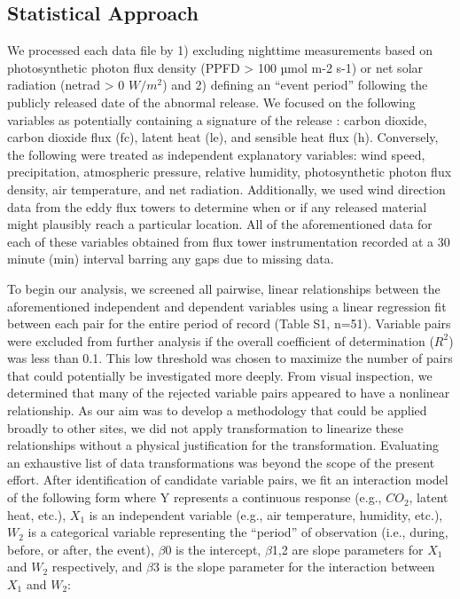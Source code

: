 \documentclass{article}
\begin{document}
\subsection{Statistical Approach}
We processed each data file by 1) excluding nighttime measurements based on photosynthetic photon flux density (PPFD > 100 µmol m-2 s-1) or net solar radiation (netrad > 0 $W/m^2$) and 2) defining an “event period” following the publicly released date of the abnormal release. We focused on the following variables as potentially containing a signature of the release : carbon dioxide, carbon dioxide flux (fc), latent heat (le), and sensible heat flux (h). Conversely, the following were treated as independent explanatory variables: wind speed, precipitation, atmospheric pressure, relative humidity, photosynthetic photon flux density, air temperature, and net radiation. Additionally, we used wind direction data from the eddy flux towers to determine when or if any released material might plausibly reach a particular location. All of the aforementioned data for each of these variables obtained from flux tower instrumentation recorded at a 30 minute (min) interval barring any gaps due to missing data.

To begin our analysis, we screened all pairwise, linear relationships between the aforementioned independent and dependent variables using a linear regression fit between each pair for the entire period of record (Table S1, n=51). Variable pairs were excluded from further analysis if the overall coefficient of determination ($R^2$) was less than 0.1. This low threshold was chosen to maximize the number of pairs that could potentially be investigated more deeply. From visual inspection, we determined that many of the rejected variable pairs appeared to have a nonlinear relationship. As our aim was to develop a methodology that could be applied broadly to other sites, we did not apply transformation to linearize these relationships without a physical justification for the transformation. Evaluating an exhaustive list of data transformations was beyond the scope of the present effort. After identification of candidate variable pairs, we fit an interaction model of the following form where Y represents a continuous response (e.g., $CO_2$, latent heat, etc.), $X_1$ is an independent variable (e.g., air temperature, humidity, etc.), $W_2$ is a categorical variable representing the “period” of observation (i.e., during, before, or after, the event), $\beta$0 is the intercept, $\beta$1,2 are slope parameters for $X_1$ and $W_2$ respectively, and $\beta$3 is the slope parameter for the interaction between $X_1$ and $W_2$:
\end{document}
